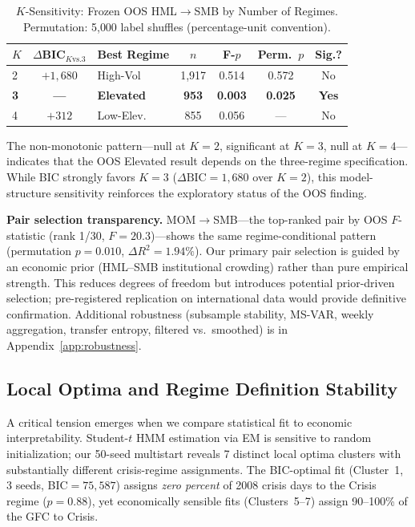 \documentclass[sigconf,anonymous]{acmart}
\begin{document}
\begin{table}[t]
\centering
\caption{$K$-Sensitivity: Frozen OOS HML$\to$SMB by Number of Regimes.
Permutation: 5{,}000 label shuffles (percentage-unit convention).}
\label{tab:k_sensitivity}
\scriptsize
\begin{tabular}{@{}lclcccc@{}}
\toprule
$K$ & $\Delta$BIC$_{K\text{vs.}3}$ & Best Regime & $n$ & F-$p$ & Perm.\ $p$ & Sig.? \\
\midrule
2 & $+1{,}680$ & High-Vol & 1{,}917 & 0.514 & 0.572 & No \\
\textbf{3} & \textbf{---} & \textbf{Elevated} & \textbf{953} & \textbf{0.003} & \textbf{0.025} & \textbf{Yes} \\
4 & $+312$ & Low-Elev. & 855 & 0.056 & --- & No \\
\bottomrule
\end{tabular}
\end{table}

The non-monotonic pattern---null at $K = 2$, significant at $K = 3$, null at $K = 4$---indicates that the OOS Elevated result depends on the three-regime specification. While BIC strongly favors $K = 3$ ($\Delta\text{BIC} = 1{,}680$ over $K = 2$), this model-structure sensitivity reinforces the exploratory status of the OOS finding.

\textbf{Pair selection transparency.}
MOM$\to$SMB---the top-ranked pair by OOS $F$-statistic (rank 1/30,
$F = 20.3$)---shows the same regime-conditional pattern (permutation
$p = 0.010$, $\Delta R^2 = 1.94\%$). Our primary pair selection is guided
by an economic prior (HML--SMB institutional crowding) rather than pure
empirical strength. This reduces degrees of freedom but introduces potential
prior-driven selection; pre-registered replication on international data would
provide definitive confirmation.
Additional robustness (subsample stability, MS-VAR, weekly aggregation,
transfer entropy, filtered vs.\ smoothed) is in Appendix~\ref{app:robustness}.


\subsection{Local Optima and Regime Definition Stability}
\label{sec:local_optima}

A critical tension emerges when we compare statistical fit to economic interpretability.
Student-$t$ HMM estimation via EM is sensitive to random initialization; our 50-seed multistart
reveals 7 distinct local optima clusters with substantially different crisis-regime assignments.
The BIC-optimal fit (Cluster~1, 3 seeds, BIC$=75{,}587$) assigns \emph{zero percent} of 2008
crisis days to the Crisis regime ($p = 0.88$), yet economically sensible fits (Clusters~5--7)
assign 90--100\% of the GFC to Crisis.
\end{document}
